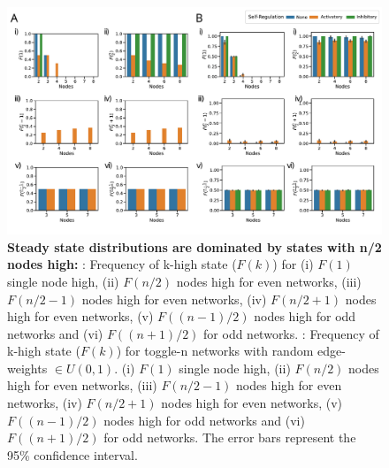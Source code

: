\documentclass[11pt,a4paper]{article}
\theoremstyle{definition}
\theoremstyle{remark}
\begin{document}
\begin{figure}[!ht]
    \begin{subfigure}[c]{\textwidth}
        \label{toggle-n}
    \end{subfigure}
    \begin{subfigure}[c]{\textwidth}
        \label{edgewt-n}
    \end{subfigure}
    \centering
    \includegraphics[width=\textwidth]{figures/Figure2}
    \caption{\textbf{Steady state distributions are dominated by states with n/2 nodes high:} : Frequency of k-high state ($F(k)$) for (i) $F(1)$ single node high, (ii) $F(n/2)$ nodes high for even networks, (iii) $F(n/2-1)$ nodes high for even networks, (iv) $F(n/2+1)$ nodes high for even networks, (v) $F((n-1)/2)$ nodes high for odd networks and (vi) $F((n+1)/2)$ for odd networks. : Frequency of k-high state ($F(k)$) for toggle-n networks with random edge-weights $\in U(0,1)$. (i) $F(1)$ single node high, (ii) $F(n/2)$ nodes high for even networks, (iii) $F(n/2-1)$ nodes high for even networks, (iv) $F(n/2+1)$ nodes high for even networks, (v) $F((n-1)/2)$ nodes high for odd networks and (vi) $F((n+1)/2)$ for odd networks. The error bars represent the 95\% confidence interval.}
    \label{steadystate}
\end{figure}
\end{document}
